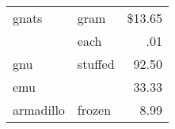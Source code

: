\documentclass{book}
\begin{document}
\centering

\begin{tabular}{||l|lr||} \hline
gnats     & gram    & \$13.65 \\\cline{2-3}
          & each    & .01 \\ \hline
gnu       & stuffed & 92.50 \\
\cline{1-1}\cline{3-3}
emu       &         & 33.33 \\ \hline
armadillo & frozen  & 8.99 \\ \hline
\end{tabular}
\end{document}
